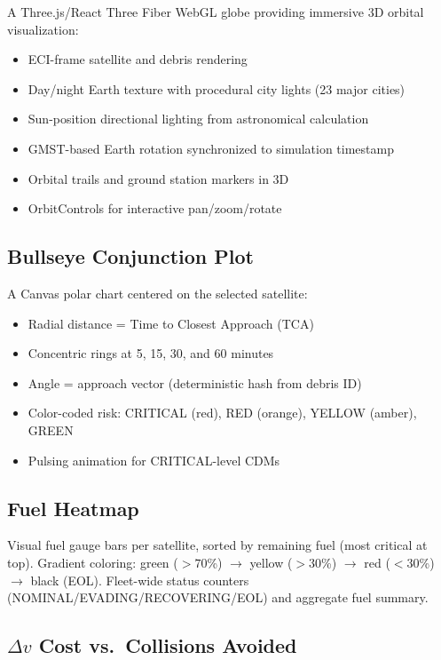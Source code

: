 \documentclass[11pt,a4paper]{article}
\begin{document}
A Three.js/React Three Fiber WebGL globe providing immersive 3D orbital
visualization:

\begin{itemize}[nosep]
  \item ECI-frame satellite and debris rendering
  \item Day/night Earth texture with procedural city lights (23 major cities)
  \item Sun-position directional lighting from astronomical calculation
  \item GMST-based Earth rotation synchronized to simulation timestamp
  \item Orbital trails and ground station markers in 3D
  \item OrbitControls for interactive pan/zoom/rotate
\end{itemize}

\subsection{Bullseye Conjunction Plot}

A Canvas polar chart centered on the selected satellite:

\begin{itemize}[nosep]
  \item Radial distance = Time to Closest Approach (TCA)
  \item Concentric rings at 5, 15, 30, and 60 minutes
  \item Angle = approach vector (deterministic hash from debris ID)
  \item Color-coded risk: CRITICAL (red), RED (orange), YELLOW (amber), GREEN
  \item Pulsing animation for CRITICAL-level CDMs
\end{itemize}

\subsection{Fuel Heatmap}

Visual fuel gauge bars per satellite, sorted by remaining fuel (most critical
at top). Gradient coloring: green ($> 70$\%) $\to$ yellow ($> 30$\%) $\to$
red ($< 30$\%) $\to$ black (EOL). Fleet-wide status counters
(NOMINAL/EVADING/RECOVERING/EOL) and aggregate fuel summary.

\subsection{$\Delta v$ Cost vs.\ Collisions Avoided}
\end{document}
